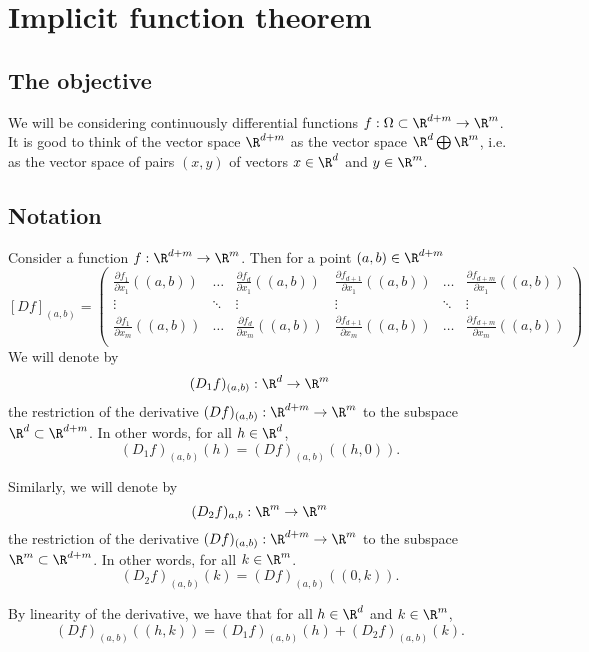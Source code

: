 \section{Implicit function theorem}

\subsection{The objective}
We will be considering continuously differential functions $f: \Omega \subset \R^{d+m} \to \R^m$.
It is good to think of the vector space $\R^{d+m}$ as the vector space $\R^d \bigoplus \R^m$, i.e.
as the vector space of pairs $(x,y)$ of vectors $x \in \R^d$ and $y \in \R^m$.

\subsection{Notation}
Consider a function $f: \R^{d+m} \to \R^m$.
Then for a point $(a,b) \in \R^{d+m}$
$$[Df]_{(a,b)}= \left(\begin{array}{ccc|ccc}
    \frac{\partial f_1}{\partial x_1}((a,b)) & \dots & \frac{\partial f_d}{\partial x_1}((a,b)) & \frac{\partial f_{d+1}}{\partial x_1}((a,b)) & \dots & \frac{\partial f_{d+m}}{\partial x_1}((a,b)) \\
    \vdots & \ddots & \vdots & \vdots & \ddots & \vdots \\
    \frac{\partial f_1}{\partial x_m}((a,b)) & \dots & \frac{\partial f_d}{\partial x_m}((a,b)) & \frac{\partial f_{d+1}}{\partial x_m}((a,b)) & \dots & \frac{\partial f_{d+m}}{\partial x_m}((a,b)) \\
    \end{array}\right)
$$
We will denote by
$$(D_1f)_{(a,b)}:\R^d\to\R^m$$
the restriction of the derivative $(Df)_{(a,b)}:\R^{d+m} \to \R^m$ to the subspace $\R^d \subset \R^{d+m}$.
In other words, for all $h \in \R^d$,
$$(D_1f)_{(a,b)}(h) = (Df)_{(a,b)}((h,0)).$$

Similarly, we will denote by
$$(D_2f)_{a,b}:\R^m \to \R^m$$
the restriction of the derivative $(Df)_{(a,b)}:\R^{d+m} \to \R^m$ to the subspace $\R^m \subset \R^{d+m}$.
In other words, for all $k \in \R^m$.
$$(D_2f)_{(a,b)}(k) = (Df)_{(a,b)}((0,k)).$$

By linearity of the derivative, we have that for all $h \in \R^d$ and $k \in \R^m$,
$$(Df)_{(a,b)}((h,k)) = (D_1f)_{(a,b)}(h) + (D_2f)_{(a,b)}(k).$$

